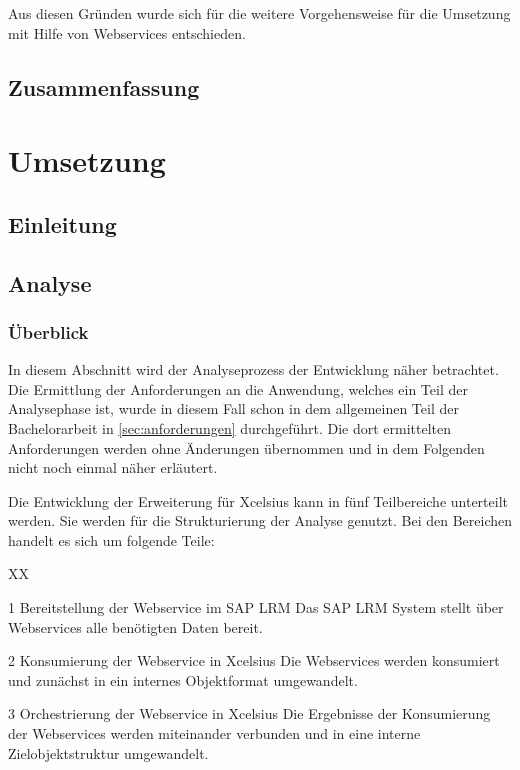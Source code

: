 \begin{onehalfspacing}
Aus diesen Gründen wurde sich für die weitere Vorgehensweise für die Umsetzung mit Hilfe von Webservices entschieden.



\section{Zusammenfassung}
\loreIpsum
\chapter{Umsetzung}
\section{Einleitung}
\loreIpsum
\section{Analyse}

\subsection{Überblick}
In diesem Abschnitt wird der Analyseprozess der Entwicklung näher betrachtet. Die Ermittlung der Anforderungen an die Anwendung, welches ein Teil der Analysephase ist, wurde in diesem Fall schon in dem allgemeinen Teil der Bachelorarbeit in \vref{sec:anforderungen} durchgeführt. Die dort ermittelten Anforderungen werden ohne Änderungen übernommen und in dem Folgenden nicht noch einmal näher erläutert.

Die Entwicklung der Erweiterung für \gls{Xcelsius} kann in fünf Teilbereiche unterteilt werden. Sie werden für die Strukturierung der Analyse genutzt. Bei den Bereichen handelt es sich um folgende Teile:


\begin{seToplist} { XX }
\item[1] Bereitstellung der Webservice im SAP LRM \newline
Das SAP LRM System stellt über Webservices alle benötigten Daten bereit.

\item[2] Konsumierung der Webservice in \gls{Xcelsius} \newline
Die Webservices werden konsumiert und zunächst in ein internes Objektformat umgewandelt.

\item[3] Orchestrierung der Webservice in \gls{Xcelsius} \newline
Die Ergebnisse der Konsumierung der Webservices werden miteinander verbunden und in eine interne Zielobjektstruktur umgewandelt.


\end{seToplist}
\end{onehalfspacing}
